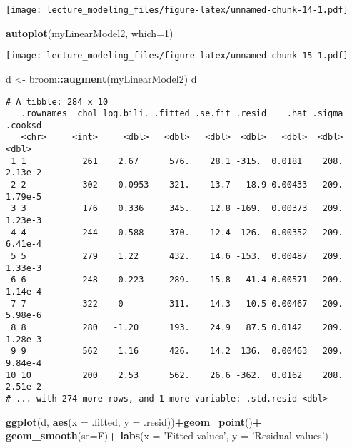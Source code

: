 \documentclass[12pt,letterpaperpaper,openany]{book}
\newenvironment{Shaded}{\begin{snugshade}}{\end{snugshade}}
\newcommand{\DataTypeTok}[1]{\textcolor[rgb]{0.13,0.29,0.53}{#1}}
\newcommand{\DecValTok}[1]{\textcolor[rgb]{0.00,0.00,0.81}{#1}}
\newcommand{\KeywordTok}[1]{\textcolor[rgb]{0.13,0.29,0.53}{\textbf{#1}}}
\newcommand{\NormalTok}[1]{#1}
\newcommand{\OperatorTok}[1]{\textcolor[rgb]{0.81,0.36,0.00}{\textbf{#1}}}
\newcommand{\StringTok}[1]{\textcolor[rgb]{0.31,0.60,0.02}{#1}}
\begin{document}
\texttt{[image: lecture\_modeling\_files/figure-latex/unnamed-chunk-14-1.pdf]}

\begin{Shaded}
\begin{Highlighting}[]
\KeywordTok{autoplot}\NormalTok{(myLinearModel2, }\DataTypeTok{which=}\DecValTok{1}\NormalTok{)}
\end{Highlighting}
\end{Shaded}

\texttt{[image: lecture\_modeling\_files/figure-latex/unnamed-chunk-15-1.pdf]}

\begin{Shaded}
\begin{Highlighting}[]
\NormalTok{d <-}\StringTok{ }\NormalTok{broom}\OperatorTok{::}\KeywordTok{augment}\NormalTok{(myLinearModel2)}
\NormalTok{d}
\end{Highlighting}
\end{Shaded}

\begin{verbatim}
# A tibble: 284 x 10
   .rownames  chol log.bili. .fitted .se.fit .resid    .hat .sigma .cooksd
   <chr>     <int>     <dbl>   <dbl>   <dbl>  <dbl>   <dbl>  <dbl>   <dbl>
 1 1           261    2.67      576.    28.1 -315.  0.0181    208. 2.13e-2
 2 2           302    0.0953    321.    13.7  -18.9 0.00433   209. 1.79e-5
 3 3           176    0.336     345.    12.8 -169.  0.00373   209. 1.23e-3
 4 4           244    0.588     370.    12.4 -126.  0.00352   209. 6.41e-4
 5 5           279    1.22      432.    14.6 -153.  0.00487   209. 1.33e-3
 6 6           248   -0.223     289.    15.8  -41.4 0.00571   209. 1.14e-4
 7 7           322    0         311.    14.3   10.5 0.00467   209. 5.98e-6
 8 8           280   -1.20      193.    24.9   87.5 0.0142    209. 1.28e-3
 9 9           562    1.16      426.    14.2  136.  0.00463   209. 9.84e-4
10 10          200    2.53      562.    26.6 -362.  0.0162    208. 2.51e-2
# ... with 274 more rows, and 1 more variable: .std.resid <dbl>
\end{verbatim}

\begin{Shaded}
\begin{Highlighting}[]
\KeywordTok{ggplot}\NormalTok{(d, }\KeywordTok{aes}\NormalTok{(}\DataTypeTok{x =}\NormalTok{ .fitted, }\DataTypeTok{y =}\NormalTok{ .resid))}\OperatorTok{+}\KeywordTok{geom_point}\NormalTok{()}\OperatorTok{+}\StringTok{ }\KeywordTok{geom_smooth}\NormalTok{(}\DataTypeTok{se=}\NormalTok{F)}\OperatorTok{+}
\StringTok{  }\KeywordTok{labs}\NormalTok{(}\DataTypeTok{x =} \StringTok{'Fitted values'}\NormalTok{, }\DataTypeTok{y =} \StringTok{'Residual values'}\NormalTok{)}
\end{Highlighting}
\end{Shaded}
\end{document}
